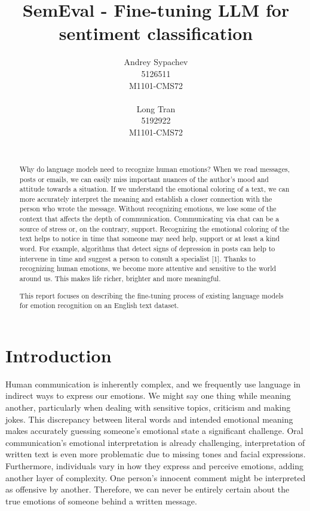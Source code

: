 \documentclass[11pt]{article}
\title{SemEval - Fine-tuning LLM for sentiment classification}
\author{Andrey Sypachev \\
  5126511\\
  M1101-CMS72 \\
  \\\And
  Long Tran \\
  5192922\\
  M1101-CMS72 \\
  \\}
\begin{document}
\maketitle
\begin{abstract}
Why do language models need to recognize human emotions?
When we read messages, posts or emails, we can easily miss important nuances of the author's mood and attitude towards a situation. If we understand the emotional coloring of a text, we can more accurately interpret the meaning and establish a closer connection with the person who wrote the message. Without recognizing emotions, we lose some of the context that affects the depth of communication. Communicating via chat can be a source of stress or, on the contrary, support. Recognizing the emotional coloring of the text helps to notice in time that someone may need help, support or at least a kind word. For example, algorithms that detect signs of depression in posts can help to intervene in time and suggest a person to consult a specialist [1]. Thanks to recognizing human emotions, we become more attentive and sensitive to the world around us. This makes life richer, brighter and more meaningful.

This report focuses on describing the fine-tuning process of existing language models for emotion recognition on an English text dataset.

\end{abstract}

\section{Introduction}

Human communication is inherently complex, and we frequently use language in indirect ways to express our emotions. We might say one thing while meaning another, particularly when dealing with sensitive topics, criticism and making jokes. This discrepancy between literal words and intended emotional meaning makes accurately guessing someone's emotional state a significant challenge. Oral communication's emotional interpretation is already challenging, interpretation of written text is even more problematic due to missing tones and facial expressions. Furthermore, individuals vary in how they express and perceive emotions, adding another layer of complexity. One person's innocent comment might be interpreted as offensive by another. Therefore, we can never be entirely certain about the true emotions of someone behind a written message.
\end{document}
